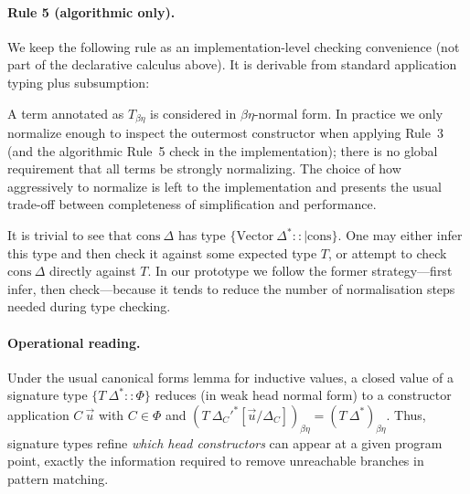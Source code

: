 \documentclass[a4paper, anonymous, UKenglish,cleveref, autoref, thm-restate]{lipics-v2021}
\begin{document}
\paragraph*{Rule 5 (algorithmic only).}
We keep the following rule as an implementation-level checking convenience (not part of the declarative calculus above). It is derivable from standard application typing plus subsumption:
\begin{mathpar}
\end{mathpar}

A term annotated as $T_{\beta\eta}$ is considered in $\beta\eta$-normal form. In practice we only normalize enough to inspect the outermost constructor when applying Rule~3 (and the algorithmic Rule~5 check in the implementation); there is no global requirement that all terms be strongly normalizing. The choice of how aggressively to normalize is left to the implementation and presents the usual trade-off between completeness of simplification and performance.

It is trivial to see that $\text{cons}\:\Delta$ has type $\{\text{Vector}\:\Delta^* :: |\text{cons}\}$. One may either infer this type and then check it against some expected type $T$, or attempt to check $\text{cons}\:\Delta$ directly against $T$. In our prototype we follow the former strategy—first infer, then check—because it tends to reduce the number of normalisation steps needed during type checking.

\paragraph*{Operational reading.}
Under the usual canonical forms lemma for inductive values, a closed value of a signature type $\{T\:\Delta^{*} :: \Phi\}$ reduces (in weak head normal form) to a constructor application $C\:\overrightarrow{u}$ with $C \in \Phi$ and $(T\:\Delta_{C}'^{*}[\overrightarrow{u}/\Delta_C])_{\beta\eta} = (T\:\Delta^{*})_{\beta\eta}$. Thus, signature types refine \emph{which head constructors} can appear at a given program point, exactly the information required to remove unreachable branches in pattern matching.
\end{document}
